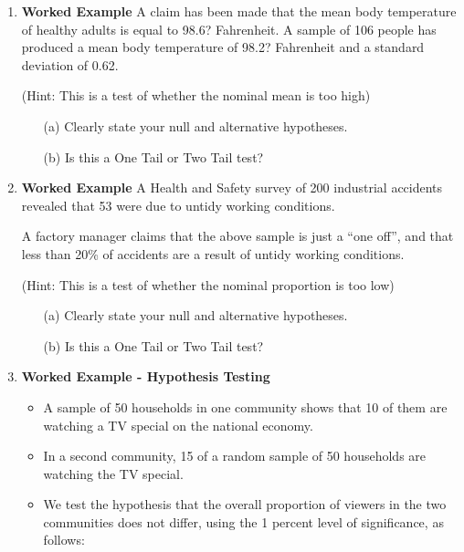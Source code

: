 \documentclass[]{report}
\begin{document}
\begin{enumerate}
\item \textbf{Worked Example}
A claim has been made that the mean body temperature of healthy adults is equal to 98.6? Fahrenheit. A sample of 106 people has produced a mean body temperature of 98.2? Fahrenheit and a standard deviation of 0.62. 

(Hint: This is a test of whether the nominal mean is too high)
\begin{itemize}
\item[(a)] Clearly state your null and alternative hypotheses.
\item[(b)] Is this a One Tail or Two Tail test?
\end{itemize}

\item \textbf{Worked Example}
A Health and Safety survey of 200 industrial accidents revealed that 53 
were due to untidy working conditions.  

A factory manager claims that the above sample is just a “one off”, and that less than 20\% of accidents are a result of untidy working conditions. 

(Hint: This is a test of whether the nominal proportion is too low)
\begin{itemize}
\item[(a)] Clearly state your null and alternative hypotheses.
\item[(b)] Is this a One Tail or Two Tail test?
\end{itemize}



\item \textbf{Worked Example   - Hypothesis Testing}

\begin{itemize}
\item A sample of 50 households in one community
shows that 10 of them are watching a TV special on the national
economy. 
\item In a second community, 15 of a random sample of 50
households are watching the TV special. 
\item We test the hypothesis
that the overall proportion of viewers in the two communities does
not differ, using the 1 percent level of significance, as follows:
\end{itemize}


\end{enumerate}
\end{document}
